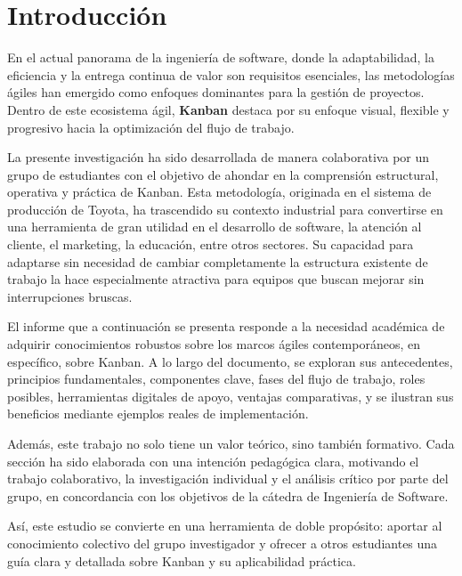 \section{Introducción}

En el actual panorama de la ingeniería de software, donde la adaptabilidad, la eficiencia y la entrega continua de valor son requisitos esenciales, las metodologías ágiles han emergido como enfoques dominantes para la gestión de proyectos. Dentro de este ecosistema ágil, \textbf{Kanban} destaca por su enfoque visual, flexible y progresivo hacia la optimización del flujo de trabajo.

La presente investigación ha sido desarrollada de manera colaborativa por un grupo de estudiantes con el objetivo de ahondar en la comprensión estructural, operativa y práctica de Kanban. Esta metodología, originada en el sistema de producción de Toyota, ha trascendido su contexto industrial para convertirse en una herramienta de gran utilidad en el desarrollo de software, la atención al cliente, el marketing, la educación, entre otros sectores. Su capacidad para adaptarse sin necesidad de cambiar completamente la estructura existente de trabajo la hace especialmente atractiva para equipos que buscan mejorar sin interrupciones bruscas.

El informe que a continuación se presenta responde a la necesidad académica de adquirir conocimientos robustos sobre los marcos ágiles contemporáneos, en específico, sobre Kanban. A lo largo del documento, se exploran sus antecedentes, principios fundamentales, componentes clave, fases del flujo de trabajo, roles posibles, herramientas digitales de apoyo, ventajas comparativas, y se ilustran sus beneficios mediante ejemplos reales de implementación. 

Además, este trabajo no solo tiene un valor teórico, sino también formativo. Cada sección ha sido elaborada con una intención pedagógica clara, motivando el trabajo colaborativo, la investigación individual y el análisis crítico por parte del grupo, en concordancia con los objetivos de la cátedra de Ingeniería de Software.

Así, este estudio se convierte en una herramienta de doble propósito: aportar al conocimiento colectivo del grupo investigador y ofrecer a otros estudiantes una guía clara y detallada sobre Kanban y su aplicabilidad práctica.
